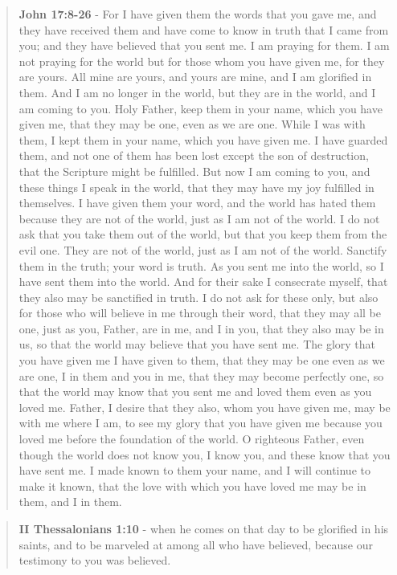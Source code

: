 \documentclass[11pt]{article}
\begin{document}
\begin{quote}
\textbf{John 17:8-26} - For I have given them the words that you gave me, and they have received them and have come to know in truth that I came from you; and they have believed that you sent me.  I am praying for them. I am not praying for the world but for those whom you have given me, for they are yours.  All mine are yours, and yours are mine, and I am glorified in them.  And I am no longer in the world, but they are in the world, and I am coming to you. Holy Father, keep them in your name, which you have given me, that they may be one, even as we are one.  While I was with them, I kept them in your name, which you have given me. I have guarded them, and not one of them has been lost except the son of destruction, that the Scripture might be fulfilled.  But now I am coming to you, and these things I speak in the world, that they may have my joy fulfilled in themselves.  I have given them your word, and the world has hated them because they are not of the world, just as I am not of the world.  I do not ask that you take them out of the world, but that you keep them from the evil one.  They are not of the world, just as I am not of the world.  Sanctify them in the truth; your word is truth.  As you sent me into the world, so I have sent them into the world.  And for their sake I consecrate myself, that they also may be sanctified in truth.  I do not ask for these only, but also for those who will believe in me through their word, that they may all be one, just as you, Father, are in me, and I in you, that they also may be in us, so that the world may believe that you have sent me.  The glory that you have given me I have given to them, that they may be one even as we are one, I in them and you in me, that they may become perfectly one, so that the world may know that you sent me and loved them even as you loved me.  Father, I desire that they also, whom you have given me, may be with me where I am, to see my glory that you have given me because you loved me before the foundation of the world.  O righteous Father, even though the world does not know you, I know you, and these know that you have sent me.  I made known to them your name, and I will continue to make it known, that the love with which you have loved me may be in them, and I in them.
\end{quote}

\begin{quote}
\textbf{II Thessalonians 1:10} - when he comes on that day to be glorified in his saints, and to be marveled at among all who have believed, because our testimony to you was believed.
\end{quote}
\end{document}
